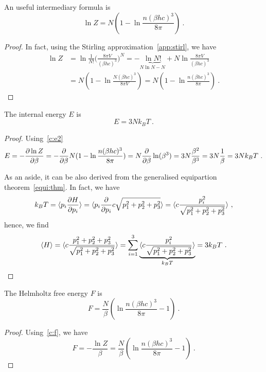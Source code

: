     An useful intermediary formula is 
    \begin{equation*}
        \ln Z = N (1 - \ln \frac{n (\beta h c)^3}{8\pi}) ~.
    \end{equation*}
    \begin{proof}
        In fact, using the Stirling approximation~\eqref{app:stirl}, we have
        \begin{equation*}
        \begin{aligned}
            \ln Z & = \ln \frac{1}{N!} \Big (\frac{8\pi V}{(\beta h c)^3} \Big )^N = - \underbrace{\ln N!}_{N \ln N - N} + N \ln \frac{8\pi V}{(\beta h c)^3} \\ & = N (1 - \ln \frac{N (\beta h c)^3}{8\pi V}) = N (1 - \ln \frac{n (\beta h c)^3}{8\pi}) ~.
        \end{aligned}
        \end{equation*}
    \end{proof}
    
    The internal energy $E$ is 
    \begin{equation*}
        E = 3 N k_B T ~.
    \end{equation*}
    \begin{proof}
        Using~\eqref{c:e2}
        \begin{equation*}
            E = - \frac{\partial\ln Z}{\partial\beta} = - \frac{\partial}{\partial\beta} N (1 - \ln \frac{n (\beta h c)^3}{8\pi}) = N \frac{\partial}{\partial\beta} \ln (\beta^3) = 3 N \frac{\beta^2}{\beta^3} = 3 N \frac{1}{\beta} = 3 N k_B T ~.
        \end{equation*}

        As an aside, it can be also derived from the generalised equipartion theorem~\eqref{equi:thm}. In fact, we have
        \begin{equation*}
            k_B T = \langle p_i \frac{\partial H}{\partial p_i}\rangle = \langle p_i \frac{\partial}{\partial p_i} c \sqrt{p_1^2 + p_2^2 + p_3^2}\rangle = \langle c \frac{p_i^2}{\sqrt{p_1^2 + p_2^2 + p_3^2}}\rangle ~,
        \end{equation*}
        hence, we find
        \begin{equation*}
            \langle H\rangle = \langle c \frac{p_1^2 + p_2^2 + p_3^2}{\sqrt{p_1^2 + p_2^2 + p_3^2}}\rangle = \sum_{i=1}^3 \underbrace{\langle c \frac{p_i^2}{\sqrt{p_1^2 + p_2^2 + p_3^2}}\rangle}_{k_B T} = 3 k_B T ~.
        \end{equation*}
    \end{proof}
    
    The Helmholtz free energy $F$ is 
    \begin{equation*}
        F = \frac{N}{\beta} (\ln \frac{n (\beta h c)^3}{8\pi} - 1) ~.
    \end{equation*}
    \begin{proof}
        Using~\eqref{c:f}, we have
        \begin{equation*}
            F = - \frac{\ln Z}{\beta} = \frac{N}{\beta} (\ln \frac{n (\beta h c)^3}{8\pi} - 1) ~.
        \end{equation*}
    \end{proof}
    
